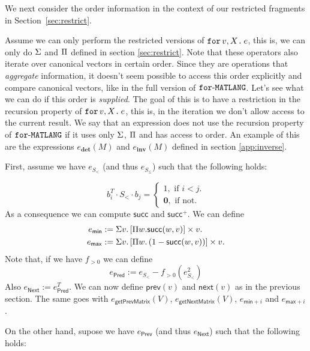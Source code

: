 We next consider the order information in the context of our restricted fragments in Section~\ref{sec:restrict}.

Assume we can only perform the restricted versions of $\texttt{for}\, v,X \texttt{.}\, e$, this is, we can only do 
$\Sigma$ and $\Pi$ defined in section \ref{sec:restrict}. Note that these operators also iterate over canonical vectors
in certain order. Since they are operations that \textit{aggregate} information, it doesn't seem
possible to access this order explicitly and compare canonical vectors, like in the full version of $\texttt{for}\text{-}\texttt{MATLANG}$.
Let's see what we can do if this order is \textit{supplied}. 
The goal of this is to have a restriction in the recursion property of $\texttt{for}\, v,X \texttt{.}\, e$, this is, 
in the iteration we don't allow access to the current result.
We say that an expression does not use the recursion property of $\texttt{for}\text{-}\texttt{MATLANG}$ if it uses
only $\Sigma$, $\Pi$ and has access to order.
An example of this are the expressions $e_{\mathbf{det}}(M)$ and $e_{\mathbf{inv}}(M)$ defined 
in section \ref{app:inverse}.

First, assume we have $e_{S_{<}}$ (and thus $e_{S_{\leq}}$) such that the following holds:

$$
b_i^T\cdot S_{<} \cdot b_j=\begin{cases}
               1, \text{ if } i < j.\\
              \mathbf{0}, \text{ if not.}
            \end{cases}
$$
As a consequence we
can compute $\mathsf{succ}$ and $\mathsf{succ}^+$. We can define
\begin{align*}
  e_{\mathsf{min}}&:=\Sigma v. \left[ \Pi w. \mathsf{succ}(w,v)\right] \times v. \\
  e_{\mathsf{max}}&:=\Sigma v. \left[ \Pi w. \left( 1-\mathsf{succ}(w,v) \right) \right] \times v.
\end{align*}
Note that, if we have $f_{>0}$ we can define
$$
e_{\mathsf{Pred}}:= e_{S_{<}}- f_{>0}(e_{S_{<}}^2)
$$
Also $e_{\mathsf{Next}}:=e_{\mathsf{Pred}}^T$.
We can now define $\mathsf{prev}(v)$ and $\mathsf{next}(v)$ as in the previous section. 
The same goes with $e_{\mathsf{getPrevMatrix}}(V)$, 
$e_{\mathsf{getNextMatrix}}(V)$, $e_{\mathsf{min}+i}$ and $e_{\mathsf{max}+i}$.

On the other hand, supose we have $e_{\mathsf{Prev}}$
(and thus $e_{\mathsf{Next}}$) such that the following holds:

